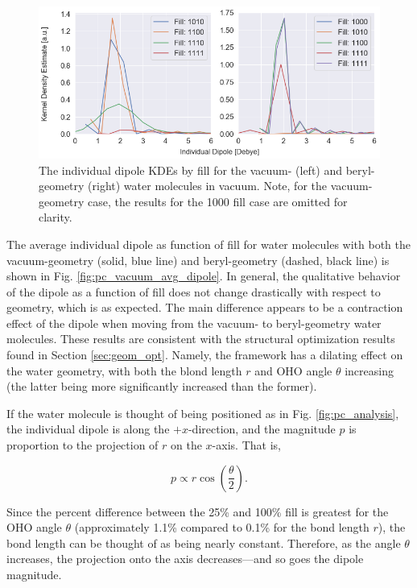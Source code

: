         \begin{figure}
            \centering
            \includegraphics[width=0.9\linewidth]{Figures/System/pc_vacuum_compare_kde.png}
            \caption{The individual dipole KDEs by fill for the vacuum- (left) and beryl-geometry (right) water molecules in vacuum. Note, for the vacuum-geometry case, the results for the 1000 fill case are omitted for clarity.}
            \label{fig:pc_vacuum_kde}
        \end{figure}
            
        The average individual dipole as function of fill for water molecules with both the vacuum-geometry (solid, blue line) and beryl-geometry (dashed, black line) is shown in Fig. \ref{fig:pc_vacuum_avg_dipole}. In general, the qualitative behavior of the dipole as a function of fill does not change drastically with respect to geometry, which is as expected. The main difference appears to be a contraction effect of the dipole when moving from the vacuum- to beryl-geometry water molecules. These results are consistent with the structural optimization results found in Section \ref{sec:geom_opt}. Namely, the framework has a dilating effect on the water geometry, with both the blond length $r$ and OHO angle $\theta$ increasing (the latter being more significantly increased than the former). 
        
        If the water molecule is thought of being positioned as in Fig. \ref{fig:pc_analysis}, the individual dipole is along the $+x$-direction, and the magnitude $p$ is proportion to the projection of $r$ on the $x$-axis. That is, 
        
        \begin{equation}
            p \propto r \cos\left(\frac{\theta}{2}\right).
        \end{equation}
        
        \noindent Since the percent difference between the 25\% and 100\% fill is greatest for the OHO angle $\theta$ (approximately 1.1\% compared to 0.1\% for the bond length $r$), the bond length can be thought of as being nearly constant. Therefore, as the angle $\theta$ increases, the projection onto the axis decreases---and so goes the dipole magnitude.
        
